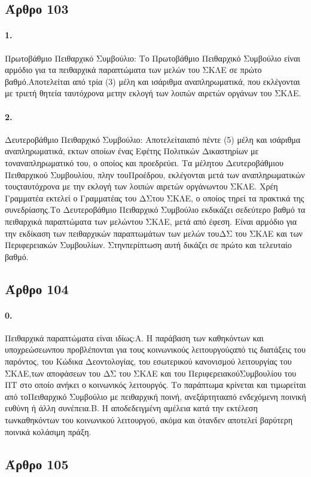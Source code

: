 \documentclass[a4paper,oneside, 10pt]{book}
\begin{document}
\subsection*{ Άρθρο 103 }
\paragraph { 1. } Πρωτοβάθμιο Πειθαρχικό Συμβούλιο: Το Πρωτοβάθμιο Πειθαρχικό Συμβούλιο είναι αρμόδιο για τα πειθαρχικά παραπτώματα των μελών του ΣΚΛΕ σε πρώτο βαθμό.Αποτελείται από τρία (3) μέλη και ισάριθμα αναπληρωματικά, που εκλέγονται με τριετή θητεία ταυτόχρονα μετην εκλογή των λοιπών αιρετών οργάνων του ΣΚΛΕ.
\paragraph { 2. } Δευτεροβάθμιο Πειθαρχικό Συμβούλιο: Αποτελείταιαπό πέντε (5) μέλη και ισάριθμα αναπληρωματικά, εκτων οποίων ένας Εφέτης Πολιτικών Δικαστηρίων με τοναναπληρωματικό του, ο οποίος και προεδρεύει. Τα μέλητου Δευτεροβάθμιου Πειθαρχικού Συμβουλίου, πλην τουΠροέδρου, εκλέγονται μετά των αναπληρωματικών τουςταυτόχρονα με την εκλογή των λοιπών αιρετών οργάνωντου ΣΚΛΕ. Χρέη Γραμματέα εκτελεί ο Γραμματέας του ΔΣτου ΣΚΛΕ, ο οποίος τηρεί τα πρακτικά της συνεδρίασης.Το Δευτεροβάθμιο Πειθαρχικό Συμβούλιο εκδικάζει σεδεύτερο βαθμό τα πειθαρχικά παραπτώματα των μελώντου ΣΚΛΕ, μετά από έφεση. Είναι αρμόδιο για την εκδίκαση των πειθαρχικών παραπτωμάτων των μελών τουΔΣ του ΣΚΛΕ και των Περιφερειακών Συμβουλίων. Στηνπερίπτωση αυτή δικάζει σε πρώτο και τελευταίο βαθμό.
\subsection*{ Άρθρο 104 }
\paragraph { 0. } Πειθαρχικά παραπτώματα είναι ιδίως:Α. Η παράβαση των καθηκόντων και υποχρεώσεωνπου προβλέπονται για τους κοινωνικούς λειτουργούςαπό τις διατάξεις του παρόντος, του Κώδικα Δεοντολογίας, του εσωτερικού κανονισμού λειτουργίας του ΣΚΛΕ,των αποφάσεων του ΔΣ του ΣΚΛΕ και του ΠεριφερειακούΣυμβουλίου του ΠΤ στο οποίο ανήκει ο κοινωνικός λειτουργός. Το παράπτωμα κρίνεται και τιμωρείται από τοΠειθαρχικό Συμβούλιο με πειθαρχική ποινή, ανεξάρτητααπό ενδεχόμενη ποινική ευθύνη ή άλλη συνέπεια.Β. Η αποδεδειγμένη αμέλεια κατά την εκτέλεση τωνκαθηκόντων του κοινωνικού λειτουργού, ακόμα και ότανδεν αποτελεί βαρύτερη ποινικά κολάσιμη πράξη.
\subsection*{ Άρθρο 105 }
\end{document}
